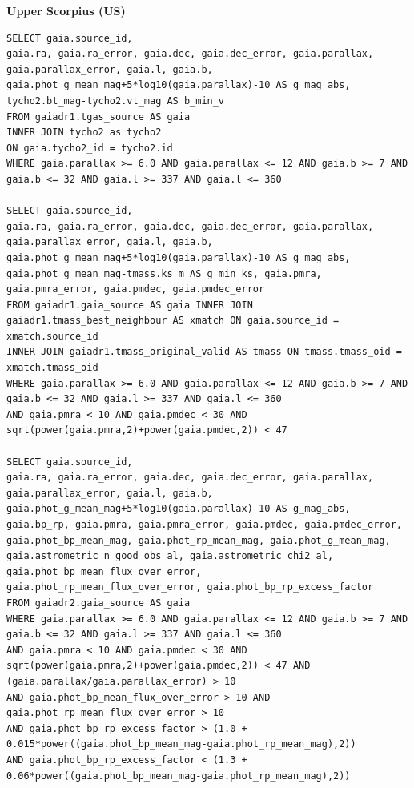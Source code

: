 \textbf{Upper Scorpius (US)}
\begin{lstlisting}[frame = single]
SELECT gaia.source_id, 
gaia.ra, gaia.ra_error, gaia.dec, gaia.dec_error, gaia.parallax, gaia.parallax_error, gaia.l, gaia.b,
gaia.phot_g_mean_mag+5*log10(gaia.parallax)-10 AS g_mag_abs,
tycho2.bt_mag-tycho2.vt_mag AS b_min_v
FROM gaiadr1.tgas_source AS gaia
INNER JOIN tycho2 as tycho2
ON gaia.tycho2_id = tycho2.id
WHERE gaia.parallax >= 6.0 AND gaia.parallax <= 12 AND gaia.b >= 7 AND gaia.b <= 32 AND gaia.l >= 337 AND gaia.l <= 360

SELECT gaia.source_id, 
gaia.ra, gaia.ra_error, gaia.dec, gaia.dec_error, gaia.parallax, gaia.parallax_error, gaia.l, gaia.b,
gaia.phot_g_mean_mag+5*log10(gaia.parallax)-10 AS g_mag_abs, 
gaia.phot_g_mean_mag-tmass.ks_m AS g_min_ks, gaia.pmra, gaia.pmra_error, gaia.pmdec, gaia.pmdec_error 
FROM gaiadr1.gaia_source AS gaia INNER JOIN gaiadr1.tmass_best_neighbour AS xmatch ON gaia.source_id = xmatch.source_id 
INNER JOIN gaiadr1.tmass_original_valid AS tmass ON tmass.tmass_oid = xmatch.tmass_oid 
WHERE gaia.parallax >= 6.0 AND gaia.parallax <= 12 AND gaia.b >= 7 AND gaia.b <= 32 AND gaia.l >= 337 AND gaia.l <= 360 
AND gaia.pmra < 10 AND gaia.pmdec < 30 AND sqrt(power(gaia.pmra,2)+power(gaia.pmdec,2)) < 47

SELECT gaia.source_id, 
gaia.ra, gaia.ra_error, gaia.dec, gaia.dec_error, gaia.parallax, gaia.parallax_error, gaia.l, gaia.b, 
gaia.phot_g_mean_mag+5*log10(gaia.parallax)-10 AS g_mag_abs, 
gaia.bp_rp, gaia.pmra, gaia.pmra_error, gaia.pmdec, gaia.pmdec_error, gaia.phot_bp_mean_mag, gaia.phot_rp_mean_mag, gaia.phot_g_mean_mag, 
gaia.astrometric_n_good_obs_al, gaia.astrometric_chi2_al, gaia.phot_bp_mean_flux_over_error, 
gaia.phot_rp_mean_flux_over_error, gaia.phot_bp_rp_excess_factor 
FROM gaiadr2.gaia_source AS gaia 
WHERE gaia.parallax >= 6.0 AND gaia.parallax <= 12 AND gaia.b >= 7 AND gaia.b <= 32 AND gaia.l >= 337 AND gaia.l <= 360 
AND gaia.pmra < 10 AND gaia.pmdec < 30 AND sqrt(power(gaia.pmra,2)+power(gaia.pmdec,2)) < 47 AND (gaia.parallax/gaia.parallax_error) > 10 
AND gaia.phot_bp_mean_flux_over_error > 10 AND gaia.phot_rp_mean_flux_over_error > 10 
AND gaia.phot_bp_rp_excess_factor > (1.0 + 0.015*power((gaia.phot_bp_mean_mag-gaia.phot_rp_mean_mag),2)) 
AND gaia.phot_bp_rp_excess_factor < (1.3 + 0.06*power((gaia.phot_bp_mean_mag-gaia.phot_rp_mean_mag),2))
\end{lstlisting}\vspace{5mm}

